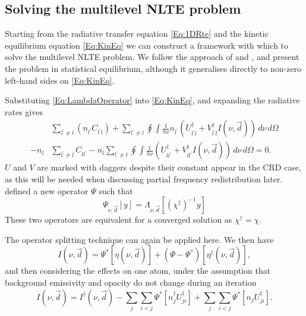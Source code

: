 \subsection{Solving the multilevel NLTE problem}

Starting from the radiative transfer equation \eqref{Eq:1DRte} and the kinetic equilibrium equation \eqref{Eq:KinEq} we can construct a framework with which to solve the multilevel NLTE problem. We follow the approach of \citet{Rybicki1992} and \citet{Uitenbroek2001}, and present the problem in statistical equilibrium, although it generalises directly to non-zero left-hand sides on \eqref{Eq:KinEq}.

Substituting \eqref{Eq:LambdaOperator} into \eqref{Eq:KinEq}, and expanding the radiative rates gives
\begin{equation}
\begin{aligned}
   &\sum_{l^\prime\neq l} (n_{l^\prime}C_{l^\prime l}) +
   \sum_{l^\prime\neq l} \oint \int \frac{1}{h\nu} n_{l^\prime} (U^\dagger_{l^\prime l} + V^\dagger_{l^\prime l} I(\nu, \vec{d}))\, d\nu\, d\Omega\\
   -
   n_l &\sum_{l^\prime\neq l} C_{l l^\prime} -
   n_l \sum_{l^\prime\neq l} \oint \int \frac{1}{h\nu} (U^\dagger_{l l^\prime} + V^\dagger_{l l^\prime} I(\nu, \vec{d}))\, d\nu\, d\Omega
   = 0.
   \label{Eq:StatEqExpanded}
\end{aligned}
\end{equation}
$U$ and $V$ are marked with daggers despite their constant appear in the CRD case, as this will be needed when discussing partial frequency redistribution later.
\citet{Rybicki1992} defined a new operator $\Psi$ such that
\begin{equation}
    \Psi_{\nu, \vec{d}}[y] = \Lambda_{\nu, \vec{d}}[(\chi^\dagger)^{-1}y]
\end{equation}
These two operators are equivalent for a converged solution as $\chi^\dagger = \chi$.

The operator splitting technique can again be applied here. We then have
\begin{equation}
    I(\nu, \vec{d}) = \Psi^*[\eta(\nu, \vec{d})] + (\Psi - \Psi^*)[\eta^\dagger(\nu, \vec{d})],
\end{equation}
and then considering the effects on one atom, under the assumption that background emissivity and opacity do not change during an iteration
\begin{equation}
    I(\nu, \vec{d}) = I^\dagger(\nu, \vec{d})
                    - \sum_j\sum_{i<j}\Psi^*[n^\dagger_j U^\dagger_{ji}]
                    + \sum_j\sum_{i<j}\Psi^*[n_j U^\dagger_{ji}].
\end{equation}

